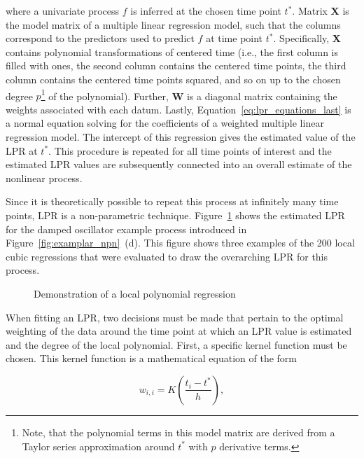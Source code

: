 \documentclass[man, floatsintext]{apa7}
\begin{document}
\noindent where a univariate process $f$ is inferred at the chosen time point
$t^*$. Matrix $\textbf{X}$ is the model matrix of a multiple linear regression
model, such that the columns correspond to the predictors used to predict $f$
at time point $t^*$. Specifically, \textbf{X} contains polynomial
transformations of centered time (i.e., the first column is filled with ones,
the second column contains the centered time points, the third column contains
the centered time points squared, and so on up to the chosen degree
$p$\footnote{Note, that the polynomial terms in this model matrix are derived
  from a Taylor series approximation around $t^*$ with $p$ derivative terms.}
of
the polynomial). Further, \textbf{W} is a diagonal matrix containing the
weights associated with each datum. Lastly,
Equation~\ref{eq:lpr_equations_last} is a normal equation solving for the
coefficients of a weighted multiple linear regression model. The intercept of
this regression gives the estimated value of the LPR at $t^*$. This procedure
is repeated for all time points of interest and the estimated LPR values are
subsequently connected into an overall estimate of the nonlinear process.

Since it is theoretically possible to repeat this process at infinitely many
time points, LPR is a non-parametric technique. Figure~\ref{fig:locpol_dem}
shows the estimated LPR for the damped oscillator example process introduced in
Figure~\ref{fig:examplar_npn}~(d). This figure shows three examples of the 200
local cubic regressions that were evaluated to draw the overarching LPR for
this process.

\begin{figure}[!t]
  \caption{Demonstration of a local polynomial regression}
  \label{fig:locpol_dem}
\end{figure}

When fitting an LPR, two decisions must be made that pertain to the optimal
weighting of the data around the time point at which an LPR value is estimated
and the degree of the local polynomial. First, a specific kernel function must
be chosen. This kernel function is a mathematical equation of the form

\begin{equation}
  w_{i, i} = K(\frac{t_i - t^*}{h}),
\end{equation}
\end{document}
